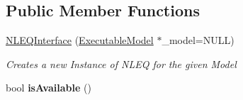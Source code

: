 \subsection*{Public Member Functions}
\begin{DoxyCompactItemize}
\item 
\hyperlink{classrr_1_1_n_l_e_q_interface_a333ab38b546011fc4ee55e0b001d121c}{N\-L\-E\-Q\-Interface} (\hyperlink{classrr_1_1_executable_model}{Executable\-Model} $\ast$\-\_\-model=N\-U\-L\-L)
\begin{DoxyCompactList}\small\item\em Creates a new Instance of N\-L\-E\-Q for the given Model \end{DoxyCompactList}\item 
\hypertarget{classrr_1_1_n_l_e_q_interface_a32beea1ec48c8e4cd39ce060f32ba1f7}{bool {\bfseries is\-Available} ()}\label{classrr_1_1_n_l_e_q_interface_a32beea1ec48c8e4cd39ce060f32ba1f7}


\end{DoxyCompactItemize}

